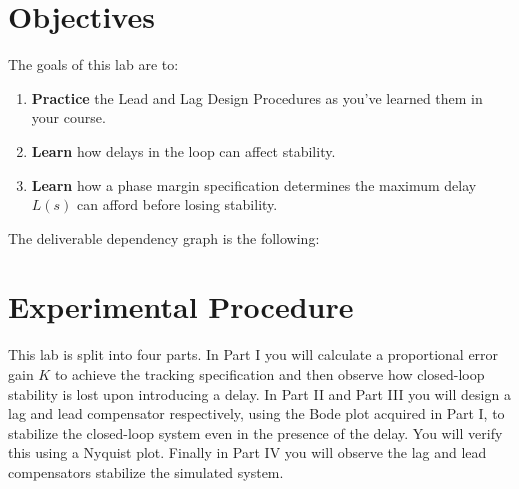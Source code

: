 \section{Objectives}\label{Lab:5:Objectives}
The goals of this lab are to:
\begin{enumerate}[label=(\arabic*)]
  \item{
    \textbf{Practice} the Lead and Lag Design Procedures as you've learned them in your course.
  }
  \item{
    \textbf{Learn} how delays in the loop can affect stability.
  }
  \item{
    \textbf{Learn} how a phase margin specification determines the maximum delay \(L(s)\) can afford before losing stability.
  }
\end{enumerate}
The deliverable dependency graph is the following:
\begin{center}
\end{center}

\section{Experimental Procedure}\label{Lab:5:Experiment}
This lab is split into four parts.
In Part I you will calculate a proportional error gain \(K\) to achieve the tracking specification and then observe how closed-loop stability is lost upon introducing a delay. 
In Part II and Part III you will design a lag and lead compensator respectively, using the Bode plot acquired in Part I, to stabilize the closed-loop system even in the presence of the delay.
You will verify this using a Nyquist plot.
Finally in Part IV you will observe the lag and lead compensators stabilize the simulated system.

